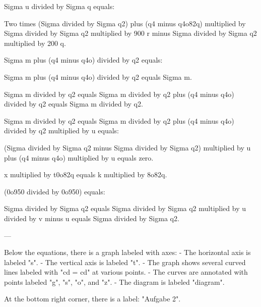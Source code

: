Sigma u divided by Sigma q equals:  

Two times (Sigma divided by Sigma q2) plus (q4 minus q4o82q) multiplied by Sigma divided by Sigma q2 multiplied by 900 r minus Sigma divided by Sigma q2 multiplied by 200 q.  

Sigma m plus (q4 minus q4o) divided by q2 equals:  

Sigma m plus (q4 minus q4o) divided by q2 equals Sigma m.  

Sigma m divided by q2 equals Sigma m divided by q2 plus (q4 minus q4o) divided by q2 equals Sigma m divided by q2.  

Sigma m divided by q2 equals Sigma m divided by q2 plus (q4 minus q4o) divided by q2 multiplied by u equals:  

(Sigma divided by Sigma q2 minus Sigma divided by Sigma q2) multiplied by u plus (q4 minus q4o) multiplied by u equals zero.  

x multiplied by t0o82q equals k multiplied by 8o82q.  

(0o950 divided by 0o950) equals:  

Sigma divided by Sigma q2 equals Sigma divided by Sigma q2 multiplied by u divided by v minus u equals Sigma divided by Sigma q2.  

---

Below the equations, there is a graph labeled with axes:  
- The horizontal axis is labeled "s".  
- The vertical axis is labeled "t".  
- The graph shows several curved lines labeled with "cd = cd" at various points.  
- The curves are annotated with points labeled "g", "s", "o", and "z".  
- The diagram is labeled "diagram".  

At the bottom right corner, there is a label: "Aufgabe 2".